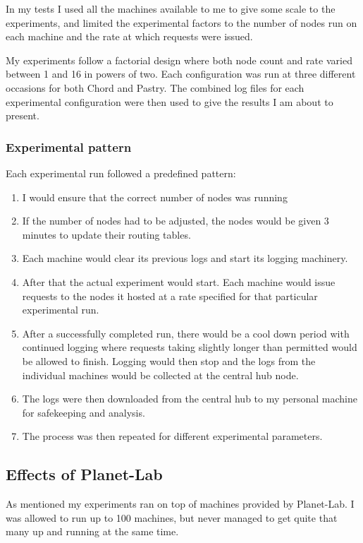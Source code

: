 In my tests I used all the machines available to me to give some scale to the experiments, and limited the experimental factors to the number of nodes run on each machine and the rate at which requests were issued.

My experiments follow a factorial design where both node count and rate varied between 1 and 16 in powers of two. Each configuration was run at three different occasions for both Chord and Pastry. The combined log files for each experimental configuration were then used to give the results I am about to present.

\subsubsection{Experimental pattern}
Each experimental run followed a predefined pattern:
\begin{enumerate}
\item I would ensure that the correct number of nodes was running
\item If the number of nodes had to be adjusted, the nodes would be given 3 minutes to update their routing tables.
\item Each machine would clear its previous logs and start its logging machinery.
\item After that the actual experiment would start. Each machine would issue requests to the nodes it hosted at a rate specified for that particular experimental run.
\item After a successfully completed run, there would be a cool down period with continued logging where requests taking slightly longer than permitted would be allowed to finish. Logging would then stop and the logs from the individual machines would be collected at the central hub node.
\item The logs were then downloaded from the central hub to my personal machine for safekeeping and analysis.
\item The process was then repeated for different experimental parameters.
\end{enumerate}

\subsection{Effects of Planet-Lab}
As mentioned my experiments ran on top of machines provided by Planet-Lab. I was allowed to run up to 100 machines, but never managed to get quite that many up and running at the same time.

